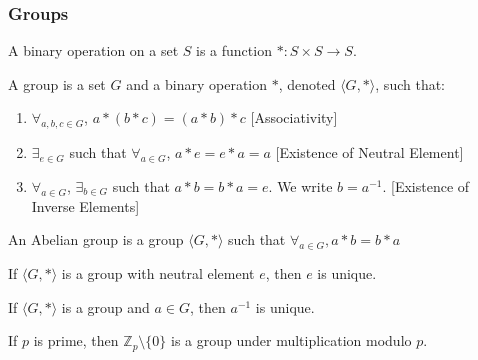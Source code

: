 \documentclass[crop=false,class=book,oneside]{standalone}
\begin{document}
            \subsubsection{Groups}
                \begin{definition}
                    A binary operation on a set $S$ is a
                    function $*:S\times S \rightarrow S$.
                \end{definition}
                \begin{definition}
                    A group is a set $G$ and a binary operation $*$,
                    denoted $\langle G,*\rangle$, such that:
                    \begin{enumerate}
                        \item $\forall_{a,b,c\in G}$, $a*(b*c)=(a*b)*c$
                              \hfill[Associativity]
                        \item $\exists_{e\in G}$ such that
                              $\forall_{a\in G}$, $a*e=e*a=a$
                              \hfill[Existence of Neutral Element]
                        \item $\forall_{a\in G}$, $\exists_{b\in G}$
                              such that $a*b=b*a=e$.
                              We write $b=a^{-1}$.
                              \hfill[Existence of Inverse Elements]
                    \end{enumerate}
                \end{definition}
                \begin{definition}
                    An Abelian group is a group $\langle G,*\rangle$
                    such that $\forall_{a\in G},a*b=b*a$
                \end{definition}
                \begin{theorem}
                    If $\langle G, *\rangle$ is a group with neutral
                    element $e$, then $e$ is unique.
                \end{theorem}
                \begin{theorem}
                    If $\langle G,*\rangle$ is a group and $a\in G$,
                    then $a^{-1}$ is unique.
                \end{theorem}
                \begin{theorem}
                    If $p$ is prime, then
                    $\mathbb{Z}_p\setminus \{0\}$ is a group
                    under multiplication modulo $p$.
                \end{theorem}
\end{document}
